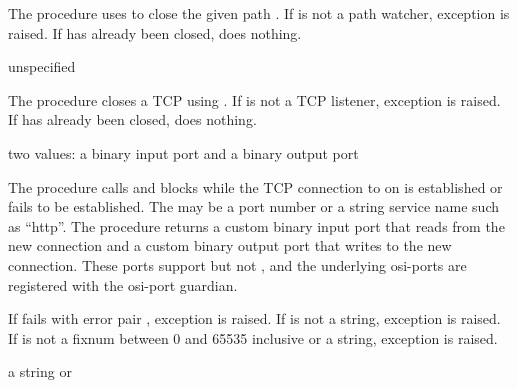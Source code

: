 The  procedure uses
 to close the given path
. If  is not a path
watcher, exception 
is raised. If  has already been closed,
 does nothing.

\begin{procedure}
\end{procedure}
\returns{} unspecified

The  procedure closes a TCP
 using
.  If  is not a TCP
listener, exception  is raised. If  has already been
closed,  does nothing.

\begin{procedure}
\end{procedure}
\returns{} two values: a binary input port and a binary output port

The  procedure calls  and
blocks while the TCP connection to  on 
is established or fails to be established.  The  may be
a port number or a string service name such as ``http''. The procedure
returns a custom binary input port that reads from the new connection
and a custom binary output port that writes to the new
connection. These ports support  but not
, and the underlying osi-ports are registered
with the osi-port guardian.

If  fails with error pair , exception  is
raised.  If  is not a string, exception  is raised. If  is not a
fixnum between 0 and 65535 inclusive or a string, exception
 is raised.

\begin{procedure}
\end{procedure}
\returns{} a string or 

